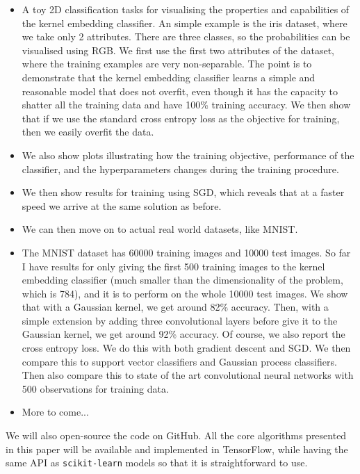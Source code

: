 \documentclass{article}
\begin{document}
	\begin{itemize}
		\item A toy 2D classification tasks for visualising the properties and capabilities of the kernel embedding classifier. An simple example is the iris dataset, where we take only 2 attributes. There are three classes, so the probabilities can be visualised using RGB. We first use the first two attributes of the dataset, where the training examples are very non-separable. The point is to demonstrate that the kernel embedding classifier learns a simple and reasonable model that does not overfit, even though it has the capacity to shatter all the training data and have 100\% training accuracy. We then show that if we use the standard cross entropy loss as the objective for training, then we easily overfit the data.
		\item We also show plots illustrating how the training objective, performance of the classifier, and the hyperparameters changes during the training procedure.
		\item We then show results for training using SGD, which reveals that at a faster speed we arrive at the same solution as before.
		\item We can then move on to actual real world datasets, like MNIST.
		\item The MNIST dataset has 60000 training images and 10000 test images. So far I have results for only giving the first 500 training images to the kernel embedding classifier (much smaller than the dimensionality of the problem, which is 784), and it is to perform on the whole 10000 test images. We show that with a Gaussian kernel, we get around 82\% accuracy. Then, with a simple extension by adding three convolutional layers before give it to the Gaussian kernel, we get around 92\% accuracy. Of course, we also report the cross entropy loss. We do this with both gradient descent and SGD. We then compare this to support vector classifiers and Gaussian process classifiers. Then also compare this to state of the art convolutional neural networks with 500 observations for training data.
		\item More to come...
	\end{itemize}
	
	We will also open-source the code on GitHub. All the core algorithms presented in this paper will be available and implemented in TensorFlow, while having the same API as \texttt{scikit-learn} models so that it is straightforward to use.
	
\end{document}
